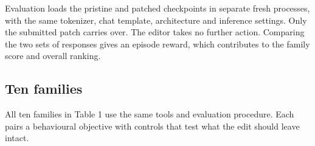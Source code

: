 Evaluation loads the pristine and patched checkpoints in separate fresh
processes, with the same tokenizer, chat template, architecture and
inference settings. Only the submitted patch carries over. The editor
takes no further action. Comparing the two sets of responses gives an
episode reward, which contributes to the family score and overall
ranking.

\subsection{Ten families}\label{ten-families}

All ten families in Table 1 use the same tools and evaluation procedure.
Each pairs a behavioural objective with controls that test what the edit
should leave intact.

\par\medskip
